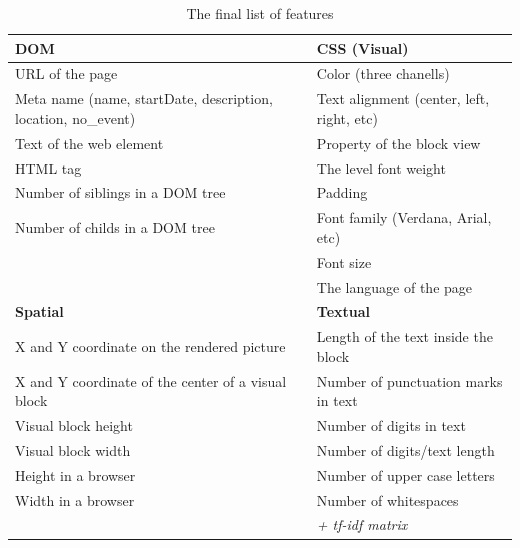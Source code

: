 \begin{table}[h]
\begin{center}
{\renewcommand{\arraystretch}{1.2}
\begin{tabular}{| p{6cm} | p{6cm} |}
\hline
\textbf{DOM}   &   \textbf{CSS (Visual)}\\
\hline
URL of the page    &    Color (three chanells)\\
Meta name (name, startDate, description, location, no\_event)    &    Text alignment (center, left, right, etc)    \\
Text of the web element    &    Property of the block view    \\
HTML tag    &    The level font weight    \\
Number of siblings in a DOM tree    &    Padding    \\
Number of childs in a DOM tree    &    Font family (Verdana, Arial, etc)    \\
    &    Font size \\
    &    The language of the page \\
\hline
\textbf{Spatial}   &   \textbf{Textual}  \\
\hline
X and Y coordinate on the rendered picture    &    Length of the text inside the block    \\
X and Y coordinate of the center of a visual block    &    Number of punctuation marks in text    \\
Visual block height     &    Number of digits in text    \\
Visual block width        &    Number of digits/text length    \\
Height in a browser     &    Number of upper case letters    \\
Width in a browser     &    Number of whitespaces    \\

     &    \textit{+ tf-idf matrix}    \\
\hline
\end{tabular}}
\caption{The final list of features}
\label{table:featurelist}
\end{center}
\end{table}    

